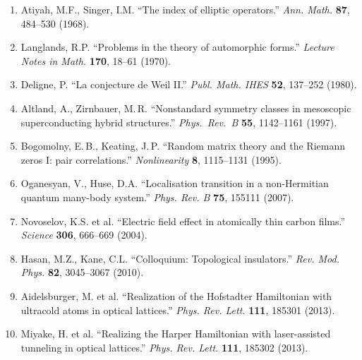 \documentclass[11pt,a4paper]{article}
\theoremstyle{plain}
\theoremstyle{definition}
\theoremstyle{remark}
\begin{document}
{\begin{enumerate}[leftmargin=*,itemsep=1pt]
    \item Atiyah, M.F., Singer, I.M. ``The index of elliptic operators.'' \emph{Ann. Math.} \textbf{87}, 484--530 (1968).
    \item Langlands, R.P. ``Problems in the theory of automorphic forms.'' \emph{Lecture Notes in Math.} \textbf{170}, 18--61 (1970).
    \item Deligne, P. ``La conjecture de Weil II.'' \emph{Publ. Math. IHES} \textbf{52}, 137--252 (1980).
    \item Altland, A., Zirnbauer, M.\,R. ``Nonstandard symmetry classes in mesoscopic superconducting hybrid structures.'' \emph{Phys.\ Rev.\ B} \textbf{55}, 1142--1161 (1997).
    \item Bogomolny, E.\,B., Keating, J.\,P. ``Random matrix theory and the Riemann zeros I: pair correlations.'' \emph{Nonlinearity} \textbf{8}, 1115--1131 (1995).
    \item Oganesyan, V., Huse, D.A. ``Localisation transition in a non-Hermitian quantum many-body system.'' \emph{Phys. Rev. B} \textbf{75}, 155111 (2007).
    \item Novoselov, K.S. et al. ``Electric field effect in atomically thin carbon films.'' \emph{Science} \textbf{306}, 666--669 (2004).
    \item Hasan, M.Z., Kane, C.L. ``Colloquium: Topological insulators.'' \emph{Rev. Mod. Phys.} \textbf{82}, 3045--3067 (2010).
    \item Aidelsburger, M. et al. ``Realization of the Hofstadter Hamiltonian with ultracold atoms in optical lattices.'' \emph{Phys. Rev. Lett.} \textbf{111}, 185301 (2013).
    \item Miyake, H. et al. ``Realizing the Harper Hamiltonian with laser-assisted tunneling in optical lattices.'' \emph{Phys. Rev. Lett.} \textbf{111}, 185302 (2013).
\end{enumerate}
}
\end{document}
